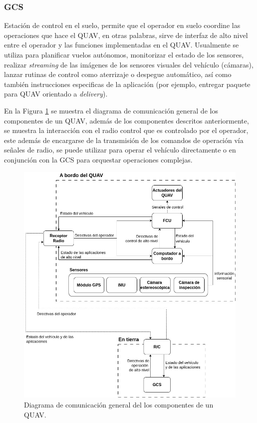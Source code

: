 \subsubsection{GCS}

Estación de control en el suelo, permite que el operador en suelo coordine las operaciones que hace el QUAV, en otras palabras, sirve de interfaz de alto nivel entre el operador y las funciones implementadas en el QUAV. Usualmente se utiliza para planificar vuelos autónomos, monitorizar el estado de los sensores, realizar \textit{streaming} de las imágenes de los sensores visuales del vehículo (cámaras), lanzar rutinas de control como aterrizaje o despegue automático, así como también instrucciones especificas de la aplicación (por ejemplo, entregar paquete para QUAV orientado a \textit{delivery}).

En la Figura \ref{fig:QUAV-components} se muestra el diagrama de comunicación general de los componentes de un QUAV, además de los componentes descritos anteriormente, se muestra la interacción con el radio control que es controlado por el operador, este además de encargarse de la transmisión de los comandos de operación vía señales de radio, se puede utilizar para operar el vehículo directamente o en conjunción con la GCS para orquestar operaciones complejas. 

\begin{figure}[H]
    \centering
    \includegraphics[scale=0.45]{partes/img/QUAV-components.jpg}
    \caption[Diagrama de comunicación general del los componentes de un QUAV.]{Diagrama de comunicación general del los componentes de un QUAV.} 
    \label{fig:QUAV-components}
\end{figure}

